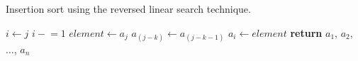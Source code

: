 \documentclass[a4paper, 12pt]{article}
\newcommand{\minuseq}{\mathrel{-}=}
\begin{document}
	
	\begin{algorithm}

		\renewcommand{\thealgorithm}{3.1.50}
		
		\caption{Insertion sort using the reversed linear search technique.}
		
		\begin{algorithmic}[1]
			
			
				\State $i \gets j$
				 
					\State $i \minuseq 1$
				\EndWhile {}
				\State $element \gets a_j$ 
					\State $a_{(j-k)} \gets a_{(j-k-1)}$
				\EndFor
				\State $a_i \gets element$ 
			\EndFor
			\State \textbf{return} $a_1$, $a_2$, $\dots$, $a_n$
			\EndProcedure
			
		\end{algorithmic}

	\end{algorithm}
\end{document}
